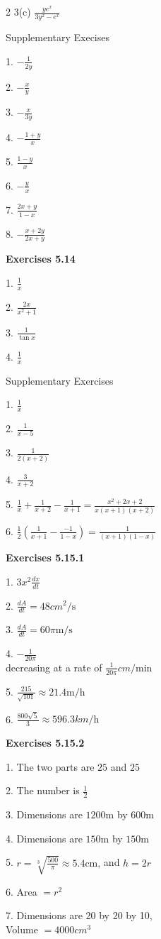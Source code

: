 \begin {multicols}{2}
3(c) $\frac{y e^{x}}{3 y^{2} -e^{x}}$ 

Supplementary Execises 

1. $ -\frac{1}{2 y}$ 

2. $ -\frac{x}{y}$ 

3. $ -\frac{x}{3 y}$ 

4. $ -\frac{1 +y}{x}$ 

5. $\frac{1 -y}{x}$ 

6. $ -\frac{y}{x}$ 

7. $\frac{2 x +y}{1 -x}$ 

8. $ -\frac{x +2 y}{2 x +y}$ 

\textbf{Exercises 5.14} 

1. $\frac{1}{x}$ 

2. $\frac{2 x}{x^{2} +1}$ 

3. $\frac{1}{\tan  x}$ 

4. $\frac{1}{x}$ 

Supplementary Exercises 

1. $\frac{1}{x}$ 

2. $\frac{1}{x -5}$ 

3. $\frac{1}{2 \left (x +2\right )}$ 

4. $\frac{3}{x +2}$ 

5. $\frac{1}{x} +\frac{1}{x +2} -\frac{1}{x +1} =\frac{x^{2} +2 x +2}{x \left (x +1\right ) \left (x +2\right )}$ 

6. $\frac{1}{2} \left (\frac{1}{x +1} -\frac{ -1}{1 -x}\right ) =\frac{1}{\left (x +1\right ) \left (1 -x\right )}$ 

\textbf{Exercises 5.15.1} 

1. $3 x^{2} \frac{d x}{d t}$ 

2. $\frac{d A}{d t} =48 cm^{2}/\mbox{s}$ 

3. $\frac{d A}{d t} =60 \pi  \mathrm{m}/\mbox{s}$ 

4. $ -\frac{1}{20 \pi }$ \\\relax decreasing at a rate of $\frac{1}{20 \pi } cm/\mbox{min}$ 

5. $\frac{215}{\sqrt{101}} \approx 21.4 \mathrm{m}/\mbox{h}$ 

6. $\frac{800 \sqrt{5}}{3} \approx 596.3 km/\mbox{h}$ 

\textbf{Exercises 5.15.2} 

1. The two parts are $25$ and $25$ 

2. The number is $\frac{1}{2}$ 

3. Dimensions are $1200 \mbox{m}$ by $600 \mbox{m}$ 

4. Dimensions are $150 \mbox{m}$ by $150 \mbox{m}$ 

5. $r =\sqrt[{3}]{\frac{500}{\pi }} \approx 5.4 \mbox{cm}\text{,}$ and $h =2 r$ 

6. Area $ =r^{2}$ 

7. Dimensions are 20 by 20 by 10, \\\relax Volume $ =4000 cm^{3}$ 


\end {multicols}
